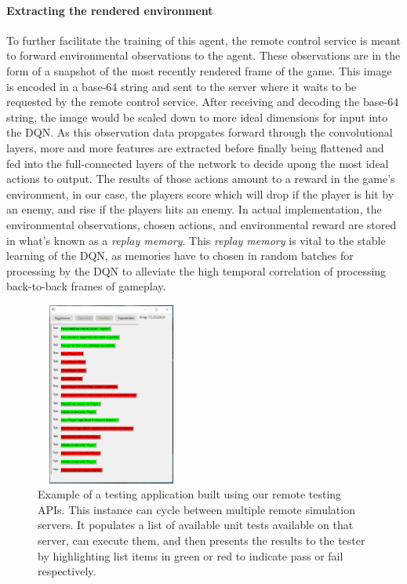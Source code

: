 \documentclass[conference]{IEEEtran}
\begin{document}
\paragraph{Extracting the rendered environment}
To further facilitate the training of this agent, the remote control service is meant to forward environmental observations to the agent. These observations are in the form of a snapshot of the most recently rendered frame of the game. This image is encoded in a base-64 string and sent to the server where it waits to be requested by the remote control service. After receiving and decoding the base-64 string, the image would be scaled down to more ideal dimensions for input into the DQN. As this observation data propgates forward through the convolutional layers, more and more features are extracted before finally being flattened and fed into the full-connected layers of the network to decide upong the most ideal actions to output. The results of those actions amount to a reward in the game's environment, in our case, the players score which will drop if the player is hit by an enemy, and rise if the players hits an enemy. In actual implementation, the environmental observations, chosen actions, and environmental reward are stored in what's known as a \textit{replay memory}. This \textit{replay memory} is vital to the stable learning of the DQN, as memories have to chosen in random batches for processing by the DQN to alleviate the high temporal correlation of processing back-to-back frames of gameplay.

\begin{figure}[htbp]
\centerline{\includegraphics [width = 5cm, height = 6cm] {images/remoteTesting.PNG}}
\caption{Example of a testing application built using our remote testing APIs. This instance can cycle between multiple remote simulation servers. It populates a list of available unit tests available on that server, can execute them, and then presents the results to the tester by highlighting list items in green or red to indicate pass or fail respectively.}
\end{figure}
\end{document}
